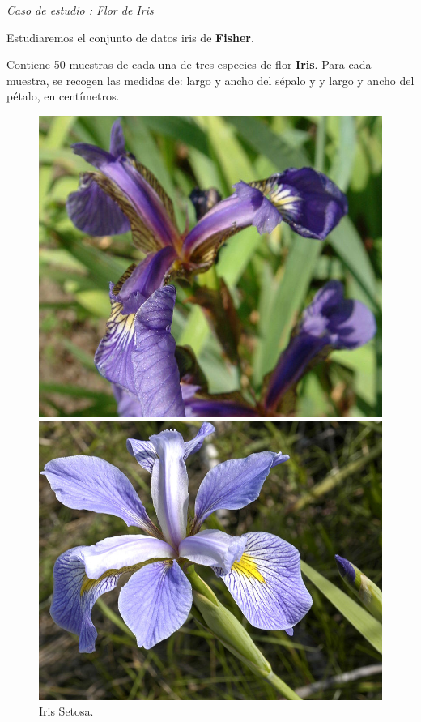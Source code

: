 \documentclass[spanish]{beamer}
\begin{document}
\begin{frame}{\textit{Caso de estudio : Flor de Iris}}

Estudiaremos el conjunto de datos iris de \textbf{Fisher}.\break

Contiene 50 muestras de cada una de tres especies de flor \textbf{Iris}. Para cada muestra, se recogen las medidas de: largo y ancho del sépalo y y largo y ancho del pétalo, en centímetros.

\begin{figure}[h]
  \centering
  \begin{minipage}[h]{0.28\textwidth}
    \includegraphics[width=\textwidth]{dani/setosa.jpg}
    \caption{Iris Setosa.}
  \end{minipage}
  \hfill
  \begin{minipage}[h]{0.28\textwidth}
    \includegraphics[width=\textwidth]{dani/virginica.jpg}

\end{minipage}
\end{figure}
\end{frame}
\end{document}
